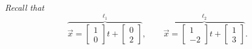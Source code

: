 \documentclass{article}
\begin{document}
	\Large \color{NavyBlue} \textit{Recall that}
	\[
		\overbrace{\vec{x} =
		\begin{bmatrix}
			1\\
			0
		\end{bmatrix}t +
		\begin{bmatrix}
			0\\
			2
		\end{bmatrix}}^{\ell_1}, \qquad \overbrace{\vec{x} =
		\begin{bmatrix}
			1 \\
			-2
		\end{bmatrix}t +
		\begin{bmatrix}
			1\\
			3
		\end{bmatrix}}^{\ell_2}.
	\]


	\medskip
\end{document}
